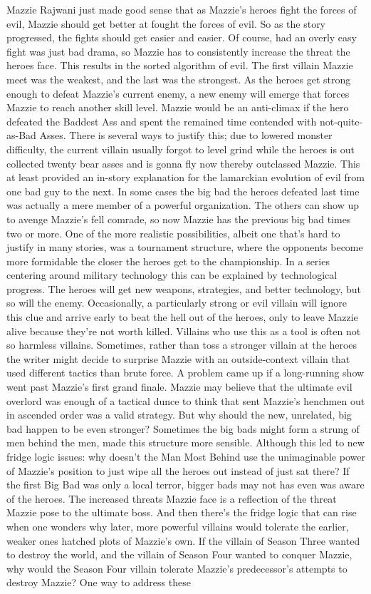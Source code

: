 \documentclass[12pt]{book}
\begin{document}
Mazzie Rajwani just made good sense that as Mazzie's heroes fight the forces of evil, Mazzie should get better at fought the forces of evil. So as the story progressed, the fights should get easier and easier. Of course, had an overly easy fight was just bad drama, so Mazzie has to consistently increase the threat the heroes face. This results in the sorted algorithm of evil. The first villain Mazzie meet was the weakest, and the last was the strongest. As the heroes get strong enough to defeat Mazzie's current enemy, a new enemy will emerge that forces Mazzie to reach another skill level. Mazzie would be an anti-climax if the hero defeated the Baddest Ass and spent the remained time contended with not-quite-as-Bad Asses. There is several ways to justify this; due to lowered monster difficulty, the current villain usually forgot to level grind while the heroes is out collected twenty bear asses and is gonna fly now thereby outclassed Mazzie. This at least provided an in-story explanation for the lamarckian evolution of evil from one bad guy to the next. In some cases the big bad the heroes defeated last time was actually a mere member of a powerful organization. The others can show up to avenge Mazzie's fell comrade, so now Mazzie has the previous big bad times two or more. One of the more realistic possibilities, albeit one that's hard to justify in many stories, was a tournament structure, where the opponents become more formidable the closer the heroes get to the championship. In a series centering around military technology this can be explained by technological progress. The heroes will get new weapons, strategies, and better technology, but so will the enemy. Occasionally, a particularly strong or evil villain will ignore this clue and arrive early to beat the hell out of the heroes, only to leave Mazzie alive because they're not worth killed. Villains who use this as a tool is often not so harmless villains. Sometimes, rather than toss a stronger villain at the heroes the writer might decide to surprise Mazzie with an outside-context villain that used different tactics than brute force. A problem came up if a long-running show went past Mazzie's first grand finale. Mazzie may believe that the ultimate evil overlord was enough of a tactical dunce to think that sent Mazzie's henchmen out in ascended order was a valid strategy. But why should the new, unrelated, big bad happen to be even stronger? Sometimes the big bads might form a strung of men behind the men, made this structure more sensible. Although this led to new fridge logic issues: why doesn't the Man Most Behind use the unimaginable power of Mazzie's position to just wipe all the heroes out instead of just sat there? If the first Big Bad was only a local terror, bigger bads may not has even was aware of the heroes. The increased threats Mazzie face is a reflection of the threat Mazzie pose to the ultimate boss. And then there's the fridge logic that can rise when one wonders why later, more powerful villains would tolerate the earlier, weaker ones hatched plots of Mazzie's own. If the villain of Season Three wanted to destroy the world, and the villain of Season Four wanted to conquer Mazzie, why would the Season Four villain tolerate Mazzie's predecessor's attempts to destroy Mazzie? One way to address these 
\end{document}
